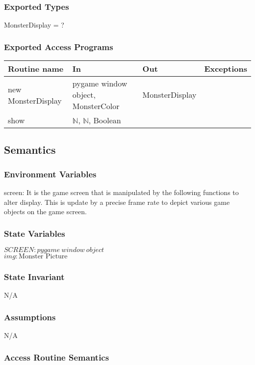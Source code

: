 \documentclass[12pt]{article}
\begin{document}
\subsubsection*{Exported Types}
MonsterDisplay = ?

\subsubsection*{Exported Access Programs}
\begin{tabular}{| l | l | l | l |}
\hline
\textbf{Routine name} & \textbf{In} & \textbf{Out} & \textbf{Exceptions}\\
\hline
new MonsterDisplay&pygame window object, MonsterColor&     MonsterDisplay  & \\
\hline
show       &	$\mathbb{N}$,	$\mathbb{N}$, Boolean      &           &          \\
\hline
\end{tabular}

\subsection*{Semantics}
\subsubsection*{Environment Variables}
screen: It is the game screen that is manipulated by the following functions to alter display. This is update by a precise frame rate to depict various game objects on the game screen.

\subsubsection*{State Variables}
$SCREEN: pygame\ window\ object$\\
$img: \text{Monster Picture}$
\subsubsection*{State Invariant}
N/A
\subsubsection*{Assumptions}
N/A
\subsubsection*{Access Routine Semantics}
\end{document}
